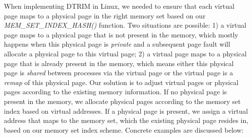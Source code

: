 \vspace{2mm}
 When
implementing DTRIM in Linux, we needed to ensure that each virtual
page maps to a physical page in the right memory set based on our
{\it MEM\_SET\_INDEX\_HASH()} function.  Two situations are possible:
1) a virtual page maps to a physical page that is not present in the
memory, which mostly happens when this physical page is
\textit{private} and a subsequent page fault will allocate a physical
page to this virtual page; 2) a virtual page maps to a physical page
that is already present in the memory, which means either this
physical page is \textit{shared} between processes via the virtual
page or the virtual page is a \textit{remap} of this physical page.
Our solution is to adjust virtual pages or physical pages according to
the existing memory information. If no physical page is present in the
memory, we allocate physical pages according to the memory set index
based on virtual addresses. If a physical page is present, we assign a
virtual address that maps to the memory set, which the existing
physical page resides in, based on our memory set index
scheme. Concrete examples are discussed below:

